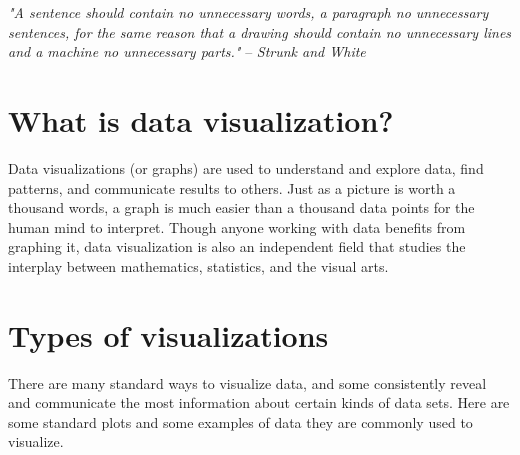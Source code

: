 \label{lab:DataVis}

\textit{"A sentence should contain no unnecessary words, a paragraph no unnecessary sentences, for the same reason that a drawing should contain no unnecessary lines and a machine no unnecessary parts."} -- \emph{Strunk and White}


\section*{What is data visualization?} 
Data visualizations (or graphs) are used to understand and explore data, find patterns, and communicate results to others. 
Just as a picture is worth a thousand words, a graph is much easier than a thousand data points for the human mind to interpret. 
Though anyone working with data benefits from graphing it, data visualization is also an independent field that studies the interplay between mathematics, statistics, and the visual arts.

\section*{Types of visualizations}
There are many standard ways to visualize data, and some consistently reveal and communicate the most information about certain kinds of data sets. 
Here are some standard plots and some examples of data they are commonly used to visualize.

